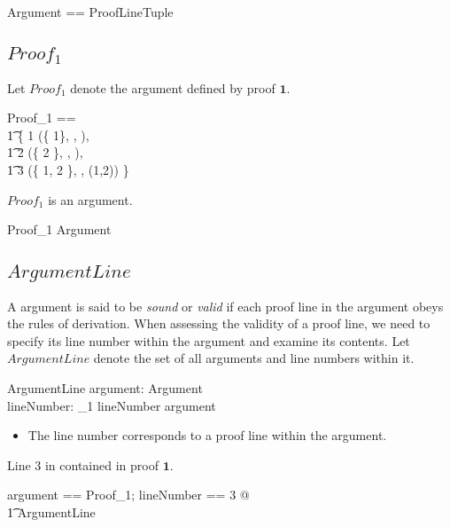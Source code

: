 \documentclass[11pt, oneside]{article}
\begin{document}
\begin{zed}
	Argument == \seq ProofLineTuple
\end{zed}

\subsection{$Proof_1$}

Let $Proof_1$ denote the argument defined by proof $\mathbf{1}$.

\begin{zed}
	Proof_1 == \\
	\t1	\{ 1 \mapsto (\{ 1\}, \propP \impliesProp \propQ, ), \\
	\t1	2 \mapsto (\{ 2 \}, \propP, ), \\
	\t1	3 \mapsto (\{ 1, 2 \}, \propQ, (1,2)) \}
\end{zed}

\begin{example}
$Proof_1$ is an argument.

\begin{zed}
	Proof_1 \in Argument
\end{zed}

\end{example}

\subsection{$ArgumentLine$}

A argument is said to be {\it sound} or {\it valid} if each proof line in the argument
obeys the rules of derivation.
When assessing the validity of a proof line, we need to specify its line number within
the argument and examine its contents.
Let $ArgumentLine$ denote the set of all arguments and line numbers within it.

\begin{schema}{ArgumentLine}
	argument: Argument \\
	lineNumber: \nat_1
\where
	lineNumber \in \dom argument
\end{schema}

\begin{itemize}
\item The line number corresponds to a proof line within the argument.
\end{itemize}

\begin{example}
Line 3 in contained in proof $\mathbf{1}$.

\begin{zed}
	\LET argument == Proof_1; lineNumber == 3 @ \\
	\t1	ArgumentLine
\end{zed}

\end{example}
\end{document}
